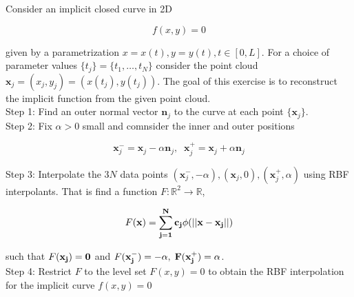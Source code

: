 Consider an implicit closed curve in 2D

$$f(x,y)=0$$

given by a parametrization $x=x(t), y=y(t), t\in[0,L]$. For a choice of parameter values
$\{t_j\}=\{t_1,\ldots,t_N\}$ consider the point cloud $\textbf{x}_j=(x_j,y_j)=(x(t_j),y(t_j))$. The goal
of this exercise is to reconstruct the implicit function from the given point cloud.\\

Step 1: Find an outer normal vector $\textbf{n}_j$ to the curve at each point $\{\textbf{x}_j\}$.\\

Step 2: Fix $\alpha>0$ small and comnsider the inner and outer positions

$$\textbf{x}_j^-=\textbf{x}_j-\alpha\textbf{n}_j,\;\;\textbf{x}_j^+=\textbf{x}_j+\alpha\textbf{n}_j$$

Step 3: Interpolate the $3N$ data points
$(\textbf{x}_j^-,-\alpha),(\textbf{x}_j,0),(\textbf{x}_j^+,\alpha)$ using RBF interpolants. That is find
a function $F:\mathbb{R}^2\to\mathbb{R}$,

$$F(\bf{x})=\sum_{j=1}^Nc_j\phi(||x-x_j||)$$

such that $F(\bf{x}_j)=0$ and $F(\bf{x}_j^-)=-\alpha,\;F(\bf{x}_j^+)=\alpha$.\\

Step 4: Restrict $F$ to the level set $F(x,y)=0$ to obtain the RBF interpolation for the implicit curve
$f(x,y)=0$\\\\

